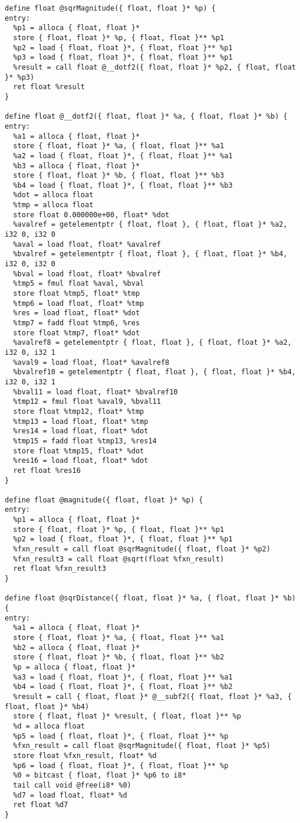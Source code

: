 \documentclass[main.tex]{subfiles}
\begin{document}
{\begin{lstlisting}
define float @sqrMagnitude({ float, float }* %p) {
entry:
  %p1 = alloca { float, float }*
  store { float, float }* %p, { float, float }** %p1
  %p2 = load { float, float }*, { float, float }** %p1
  %p3 = load { float, float }*, { float, float }** %p1
  %result = call float @__dotf2({ float, float }* %p2, { float, float }* %p3)
  ret float %result
}

define float @__dotf2({ float, float }* %a, { float, float }* %b) {
entry:
  %a1 = alloca { float, float }*
  store { float, float }* %a, { float, float }** %a1
  %a2 = load { float, float }*, { float, float }** %a1
  %b3 = alloca { float, float }*
  store { float, float }* %b, { float, float }** %b3
  %b4 = load { float, float }*, { float, float }** %b3
  %dot = alloca float
  %tmp = alloca float
  store float 0.000000e+00, float* %dot
  %avalref = getelementptr { float, float }, { float, float }* %a2, i32 0, i32 0
  %aval = load float, float* %avalref
  %bvalref = getelementptr { float, float }, { float, float }* %b4, i32 0, i32 0
  %bval = load float, float* %bvalref
  %tmp5 = fmul float %aval, %bval
  store float %tmp5, float* %tmp
  %tmp6 = load float, float* %tmp
  %res = load float, float* %dot
  %tmp7 = fadd float %tmp6, %res
  store float %tmp7, float* %dot
  %avalref8 = getelementptr { float, float }, { float, float }* %a2, i32 0, i32 1
  %aval9 = load float, float* %avalref8
  %bvalref10 = getelementptr { float, float }, { float, float }* %b4, i32 0, i32 1
  %bval11 = load float, float* %bvalref10
  %tmp12 = fmul float %aval9, %bval11
  store float %tmp12, float* %tmp
  %tmp13 = load float, float* %tmp
  %res14 = load float, float* %dot
  %tmp15 = fadd float %tmp13, %res14
  store float %tmp15, float* %dot
  %res16 = load float, float* %dot
  ret float %res16
}

define float @magnitude({ float, float }* %p) {
entry:
  %p1 = alloca { float, float }*
  store { float, float }* %p, { float, float }** %p1
  %p2 = load { float, float }*, { float, float }** %p1
  %fxn_result = call float @sqrMagnitude({ float, float }* %p2)
  %fxn_result3 = call float @sqrt(float %fxn_result)
  ret float %fxn_result3
}

define float @sqrDistance({ float, float }* %a, { float, float }* %b) {
entry:
  %a1 = alloca { float, float }*
  store { float, float }* %a, { float, float }** %a1
  %b2 = alloca { float, float }*
  store { float, float }* %b, { float, float }** %b2
  %p = alloca { float, float }*
  %a3 = load { float, float }*, { float, float }** %a1
  %b4 = load { float, float }*, { float, float }** %b2
  %result = call { float, float }* @__subf2({ float, float }* %a3, { float, float }* %b4)
  store { float, float }* %result, { float, float }** %p
  %d = alloca float
  %p5 = load { float, float }*, { float, float }** %p
  %fxn_result = call float @sqrMagnitude({ float, float }* %p5)
  store float %fxn_result, float* %d
  %p6 = load { float, float }*, { float, float }** %p
  %0 = bitcast { float, float }* %p6 to i8*
  tail call void @free(i8* %0)
  %d7 = load float, float* %d
  ret float %d7
}


\end{lstlisting}}
\end{document}
